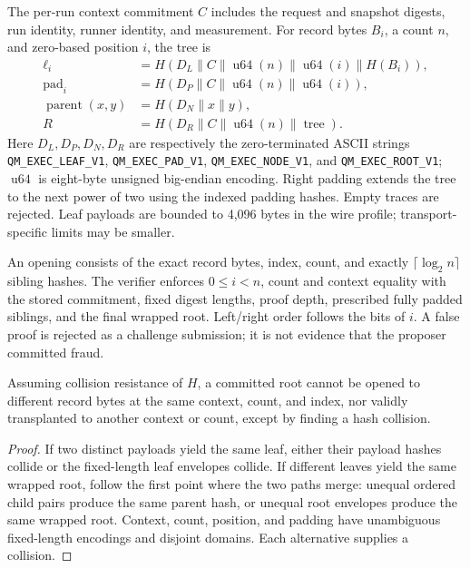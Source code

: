 The per-run context commitment $C$ includes the request and snapshot digests, run identity, runner identity, and measurement. For record bytes $B_i$, a count $n$, and zero-based position $i$, the tree is
\begin{align}
\ell_i &= H(D_L\|C\|\operatorname{u64}(n)\|\operatorname{u64}(i)\|H(B_i)),\\
\operatorname{pad}_i &= H(D_P\|C\|\operatorname{u64}(n)\|\operatorname{u64}(i)),\\
\operatorname{parent}(x,y) &= H(D_N\|x\|y),\\
R &= H(D_R\|C\|\operatorname{u64}(n)\|\operatorname{tree}).
\end{align}
Here $D_L,D_P,D_N,D_R$ are respectively the zero-terminated ASCII strings \texttt{QM\_EXEC\_LEAF\_V1}, \texttt{QM\_EXEC\_PAD\_V1}, \texttt{QM\_EXEC\_NODE\_V1}, and \texttt{QM\_EXEC\_ROOT\_V1}; $\operatorname{u64}$ is eight-byte unsigned big-endian encoding. Right padding extends the tree to the next power of two using the indexed padding hashes. Empty traces are rejected. Leaf payloads are bounded to 4,096 bytes in the wire profile; transport-specific limits may be smaller.

An opening consists of the exact record bytes, index, count, and exactly $\lceil\log_2 n\rceil$ sibling hashes. The verifier enforces $0\leq i<n$, count and context equality with the stored commitment, fixed digest lengths, proof depth, prescribed fully padded siblings, and the final wrapped root. Left/right order follows the bits of $i$. A false proof is rejected as a challenge submission; it is not evidence that the proposer committed fraud.

\begin{proposition}
Assuming collision resistance of $H$, a committed root cannot be opened to different record bytes at the same context, count, and index, nor validly transplanted to another context or count, except by finding a hash collision.
\end{proposition}
\begin{proof}
If two distinct payloads yield the same leaf, either their payload hashes collide or the fixed-length leaf envelopes collide. If different leaves yield the same wrapped root, follow the first point where the two paths merge: unequal ordered child pairs produce the same parent hash, or unequal root envelopes produce the same wrapped root. Context, count, position, and padding have unambiguous fixed-length encodings and disjoint domains. Each alternative supplies a collision.
\end{proof}

